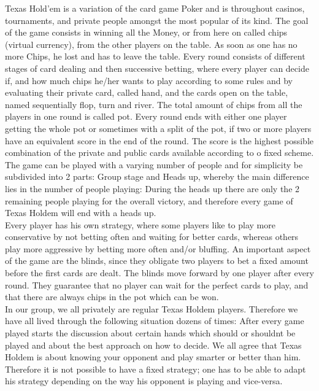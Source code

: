 \documentclass[11pt]{article}
\begin{document}
Texas Hold'em is a variation of the card game Poker and is throughout casinos, tournaments, and private people amongst the most popular of its kind. The goal of the game consists in winning all the Money, or from here on called chips (virtual currency), from the other players on the table. As soon as one has no more Chips, he lost and has to leave the table.
Every round consists of different stages of card dealing and then successive betting, where every player can decide if, and how much chips he/her wants to play according to some rules and by evaluating their private card, called hand, and the cards open on the table, named sequentially flop, turn and river.
The total amount of chips from all the players in one round is called pot. Every round ends with either one player getting the whole pot or sometimes with a split of the pot, if two or more players have an equivalent score in the end of the round. The score is the highest possible combination of the private and public cards available according to o fixed scheme.
\\
The game can be played with a varying number of people and for simplicity be subdivided into 2 parts: Group stage and Heads up, whereby the main difference lies in the number of people playing: During the heads up there are only the 2 remaining people playing for the overall victory, and therefore every game of Texas Holdem will end with a heads up.
\\
Every player has his own strategy, where some players like to play more conservative by not betting often and waiting for better cards, whereas others play more aggressive by betting more often and/or bluffing. An important aspect of the game are the blinds, since they obligate two players to bet a fixed amount before the first cards are dealt. The blinds move forward by one player after every round. They guarantee that no player can wait for the perfect cards to play, and that there are always chips in the pot which can be won.
\\
In our group, we all privately are regular Texas Holdem players. Therefore we have all lived through the following situation dozens of times: After every game played starts the discussion about certain hands which should or shouldnt be played and about the best approach on how to decide. We all agree that Texas Holdem is about knowing your opponent and play smarter or better than him. Therefore it is not possible to have a fixed strategy; one has to be able to adapt his strategy depending on the way his opponent is playing and vice-versa.
\\
\end{document}
